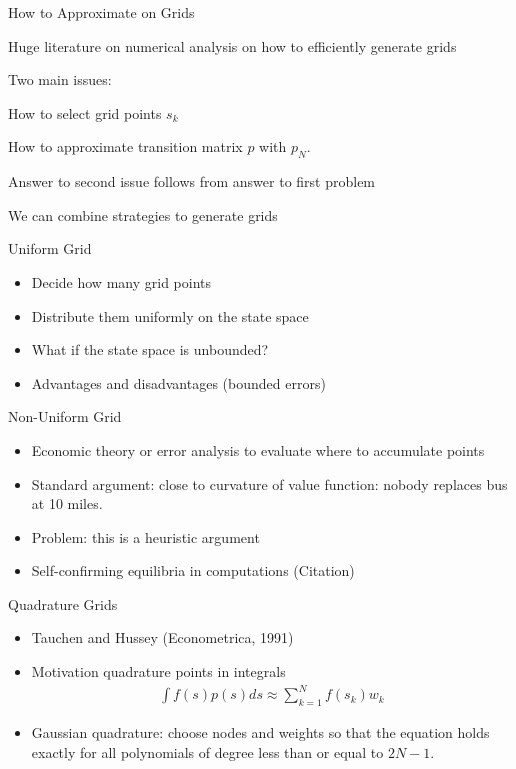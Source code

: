 \documentclass[xcolor=pdftex,dvipsnames,table,mathserif]{beamer}
\begin{document}
\begin{frame}{How to Approximate on Grids}
\begin{outline}
\item Huge literature on numerical analysis on how to efficiently generate grids
\item Two main issues:
\begin{outline}
\item How to select grid points $s_k$
\item How to approximate transition matrix $p$ with $p_N$.
\end{outline}
\item Answer to second issue follows from answer to first problem
\item We can combine strategies to generate grids
\end{outline}
\end{frame}

\begin{frame}{Uniform Grid}
\begin{itemize}
\item Decide how many grid points
\item Distribute them uniformly on the state space
\item What if the state space is unbounded?
\item Advantages and disadvantages (bounded errors)
\end{itemize}
\end{frame}


\begin{frame}{Non-Uniform Grid}
\begin{itemize}
\item Economic theory or error analysis to evaluate where to accumulate points
\item Standard argument: close to curvature of value function: nobody replaces bus at 10 miles.
\item Problem: this is a heuristic argument
\item Self-confirming equilibria in computations (Citation)
\end{itemize}
\end{frame}

\begin{frame}{Quadrature Grids}
\begin{itemize}
\item Tauchen and Hussey (Econometrica, 1991)
\item Motivation quadrature points in integrals
\begin{eqnarray*}
\int f(s) p(s) d s \approx \sum_{k=1}^N f(s_k) w_k
\end{eqnarray*}
\item Gaussian quadrature: choose nodes and weights so that the equation holds exactly for all polynomials of degree less than or equal to $2N -1$.
\end{itemize}
\end{frame}
\end{document}
